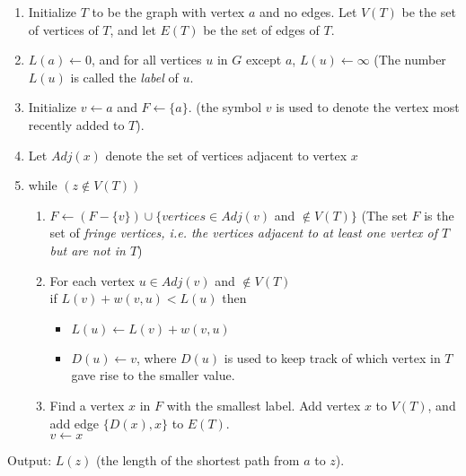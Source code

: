 \documentclass[a4paper]{article}
\begin{document}
\begin{enumerate}
	\item Initialize $T$ to be the graph with vertex $a$ and no edges. Let $V(T)$ be the set of vertices of $T$, and let $E(T)$ be the set of edges of $T$.
	\item $L(a) \leftarrow 0$, and for all vertices $u$ in $G$ except $a$, $L(u) \leftarrow \infty$ (The number $L(u)$ is called the \textit{label} of $u$.
	\item Initialize $v \leftarrow a$ and $F\leftarrow \{a\}$. (the symbol $v$ is used to denote the vertex most recently added to $T$).
	\item[] Let $Adj(x)$ denote the set of vertices adjacent to vertex $x$
	\item while $(z\notin V(T))$
	\begin{enumerate}
		\item $F\leftarrow (F-\{v\}) \cup \{vertices \in Adj(v)$ and $\notin V(T)\}$ (The set $F$ is the set of \textit{fringe vertices, i.e. the vertices adjacent to at least one vertex of $T$ but are not in $T$})
		\item For each vertex $u \in Adj(v)$ and $\notin V(T)$\\
		if $L(v) + w(v, u) < L(u)$ then
		\begin{itemize}
			\item[] $L(u) \leftarrow L(v) + w(v,u)$
			\item[] $D(u) \leftarrow v$, where $D(u)$ is used to keep track of which vertex in $T$ gave rise to the smaller value.
		\end{itemize}
		\item Find a vertex $x$ in $F$ with the smallest label. Add vertex $x$ to $V(T)$, and add edge $\{D(x), x\}$ to $E(T)$.\\
		$v\leftarrow x$
	\end{enumerate}
\end{enumerate}
Output: $L(z)$ (the length of the shortest path from $a$ to $z$).
\end{document}
